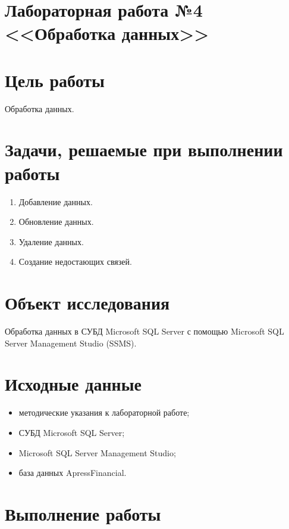\documentclass[a4paper, 14pt]{extarticle}
\begin{document}
\setcounter{page}{2}

\linespread{1.5}
\renewcommand{\baselinestretch}{1.5}

\section*{\large{Лабораторная работа №4 <<Обработка данных>>}}

\section{Цель работы}

Обработка данных.

\section{Задачи, решаемые при выполнении работы}

\begin{enumerate}[leftmargin=*]
  \item Добавление данных.
  \item Обновление данных.
  \item Удаление данных.
  \item Создание недостающих связей.
\end{enumerate}

\section{Объект исследования}

Обработка данных в СУБД \foreignlanguage{english}{Microsoft SQL Server} с
помощью \foreignlanguage{english}{Microsoft SQL Server Management Studio
  (SSMS)}.

\section{Исходные данные}

\begin{itemize}
  \item методические указания к лабораторной работе;
  \item СУБД Microsoft SQL Server;
  \item Microsoft SQL Server Management Studio;
  \item база данных ApressFinancial.
\end{itemize}

\section{Выполнение работы}
\end{document}
